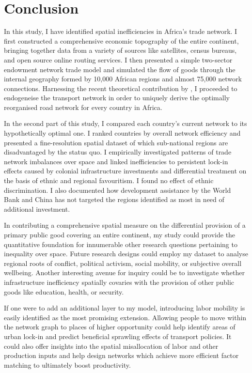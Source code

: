 \documentclass[11pt, oneside]{article}   	%
\begin{document}
\section{Conclusion}
\label{chap:conclusion}

In this study, I have identified spatial inefficiencies in Africa's trade network. I first constructed a comprehensive economic topography of the entire continent, bringing together data from a variety of sources like satellites, census bureaus, and open source online routing services. I then presented a simple two-sector endowment network trade model and simulated the flow of goods through the internal geography formed by 10,000 African regions and almost 75,000 network connections. Harnessing the recent theoretical contribution by \cite{fajgelbaum_optimal_2017}, I proceeded to endogeneise the transport network in order to uniquely derive the optimally reorganised road network for every country in Africa.

In the second part of this study, I compared each country's current network to its hypothetically optimal one. I ranked countries by overall network efficiency and presented a fine-resolution spatial dataset of which sub-national regions are disadvantaged by the status quo. I empirically investigated patterns of trade network imbalances over space and linked inefficiencies to persistent lock-in effects caused by colonial infrastructure investments and differential treatment on the basis of ethnic and regional favouritism. I found no effect of ethnic discrimination. I also documented how development assistance by the World Bank and China has not targeted the regions identified as most in need of additional investment.

In contributing a comprehensive spatial measure on the differential provision of a primary public good covering an entire continent, my study could provide the quantitative foundation for innumerable other research questions pertaining to inequality over space. Future research designs could employ my dataset to analyse regional roots of conflict, political activism, social mobility, or subjective overall wellbeing. Another interesting avenue for inquiry could be to investigate whether infrastructure inefficiency spatially covaries with the provision of other public goods like education, health, or security.

If one were to add an additional layer to my model, introducing labor mobility is easily identified as the most promising extension. Allowing people to move within the network graph to places of higher opportunity could help identify areas of urban lock-in and predict beneficial sprawling effects of transport policies. It could also offer insights into the spatial misallocation of labor and other production inputs and help design networks which achieve more efficient factor matching to ultimately boost productivity.
\end{document}
